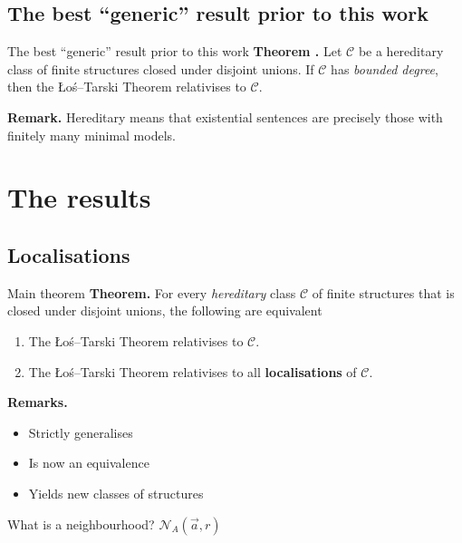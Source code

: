 \documentclass{beamer}
\newcommand{\tightlist}{}
\begin{document}
\subsection{The best ``generic'' result prior to this work}

\begin{frame}{The best ``generic'' result prior to this work}
\textbf{Theorem \autocite{ADG08}.} Let \(\mathcal{C}\) be a hereditary
class of finite structures closed under disjoint unions. If
\(\mathcal{C}\) has \emph{bounded degree}, then the Łoś--Tarski Theorem
relativises to \(\mathcal{C}\).

\textbf{Remark.} Hereditary means that existential sentences are
precisely those with finitely many minimal models.
\end{frame}

\section{The results}\label{the-results}

\subsection{Localisations}\label{localisations}

\begin{frame}{Main theorem}
\textbf{Theorem.} For every \emph{hereditary} class \(\mathcal{C}\) of
finite structures that is closed under disjoint unions, the following
are equivalent

\begin{enumerate}
\tightlist
\item
  The Łoś--Tarski Theorem relativises to \(\mathcal{C}\).
\item
  The Łoś--Tarski Theorem relativises to all \textbf{localisations} of
  \(\mathcal{C}\).
\end{enumerate}

\textbf{Remarks.}

\begin{itemize}
\tightlist
\item
  Strictly generalises \autocite{ADG08}
\item
  Is now an equivalence
\item
  Yields new classes of structures
\end{itemize}
\end{frame}

\begin{frame}{What is a neighbourhood?}
\(\mathcal{N}_{A}(\vec{a}, r)\)
\end{frame}
\end{document}
